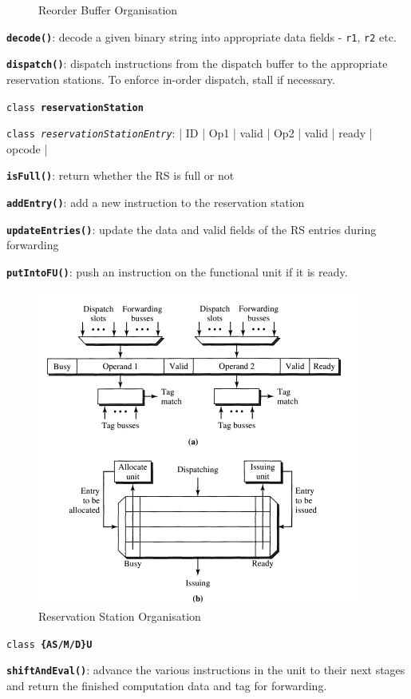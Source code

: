 \documentclass[12pt,a4paper,english]{paper}
\begin{document}
\begin{compactitem}
\begin{figure}[H]
    \caption{Reorder Buffer Organisation \cite{shen_modern_2013}}
    \label{fig:hierarchy}
\end{figure}
        \item \texttt{\textbf{decode()}}: decode a given binary string into appropriate data fields - \texttt{r1}, \texttt{r2} etc.
        \item \texttt{\textbf{dispatch()}}: dispatch instructions from the dispatch buffer to the appropriate reservation stations. To enforce in-order dispatch, stall if necessary.
        \item \texttt{class \textbf{reservationStation}}
        \begin{compactitem}
            \item \texttt{class \textit{reservationStationEntry}}: | ID | Op1 | valid | Op2 | valid | ready | opcode |
            \item \texttt{\textbf{isFull()}}: return whether the RS is full or not
            \item \texttt{\textbf{addEntry()}}: add a new instruction to the reservation station
            \item \texttt{\textbf{updateEntries()}}: update the data and valid fields of the RS entries during forwarding
            \item \texttt{\textbf{putIntoFU()}}: push an instruction on the functional unit if it is ready.
        \end{compactitem}
\begin{figure}[H]
    \centering
    \includegraphics[scale=0.7]{RS.png}
    \caption{Reservation Station Organisation \cite{shen_modern_2013}}
    \label{fig:hierarchy}
\end{figure}        
        \item \texttt{class \textbf{\{AS/M/D\}U}}
        \begin{compactitem}
            \item \texttt{\textbf{shiftAndEval()}}: advance the various instructions in the unit to their next stages and return the finished computation data and tag for forwarding.
        \end{compactitem}
    \end{compactitem}
\end{document}
